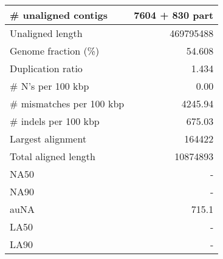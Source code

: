 \documentclass[12pt,a4paper]{article}
\begin{document}
\begin{table}[ht]
\begin{center}
\begin{tabular}{|l*{1}{|r}|}
\# unaligned contigs & 7604 + 830 part \\ \hline
Unaligned length & 469795488 \\ \hline
Genome fraction (\%) & 54.608 \\ \hline
Duplication ratio & 1.434 \\ \hline
\# N's per 100 kbp & 0.00 \\ \hline
\# mismatches per 100 kbp & 4245.94 \\ \hline
\# indels per 100 kbp & 675.03 \\ \hline
Largest alignment & 164422 \\ \hline
Total aligned length & 10874893 \\ \hline
NA50 & - \\ \hline
NA90 & - \\ \hline
auNA & 715.1 \\ \hline
LA50 & - \\ \hline
LA90 & - \\ \hline
\end{tabular}
\end{center}
\end{table}
\end{document}
